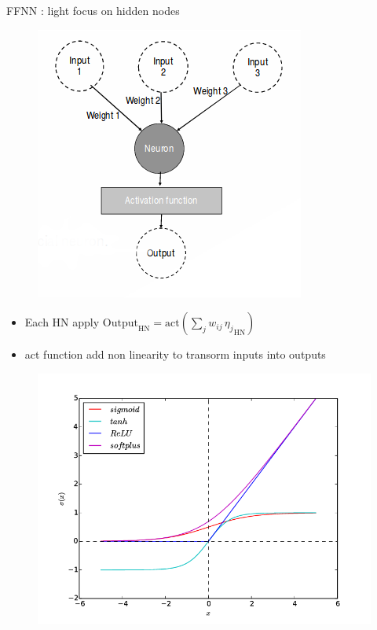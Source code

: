 \documentclass[10pt,
			   xcolor=svgnames,
			   hyperref={linkcolor=red, citecolor = DarkGreen, colorlinks=true, urlcolor=Navy}] {beamer}
\newcommand{\bepar}[1]{
	\left( #1 \right)  
}
\newcommand{\sarrow}{\item[\color{blue!50!black!70!orange!60} \tiny{\ding{55}}]}
\begin{document}
\begin{frame}{FFNN : light focus on hidden nodes}
	\begin{multicols}{2}
	
		\noindent		
		\begin{figure}[!ht]
		\centering
		\includegraphics[scale=0.4]{hidden_nodes.png}
		\end{figure}
		
		\columnbreak

		\begin{itemize}
			\sarrow Each HN apply $\text{Output}_\text{HN} = \text{act}\bepar{\sum_j w_{ij}\,{\eta_j}_{\text{HN}}}$ 
			\sarrow act function add non linearity to transorm inputs into outputs
			
		\end{itemize}
		\vspace{-4mm}
\begin{figure}[!ht]
		\centering
		\includegraphics[scale=0.23]{The-most-common-nonlinear-activation-functions.png}
		\end{figure}		
		
	\end{multicols}

\end{frame}
\end{document}
